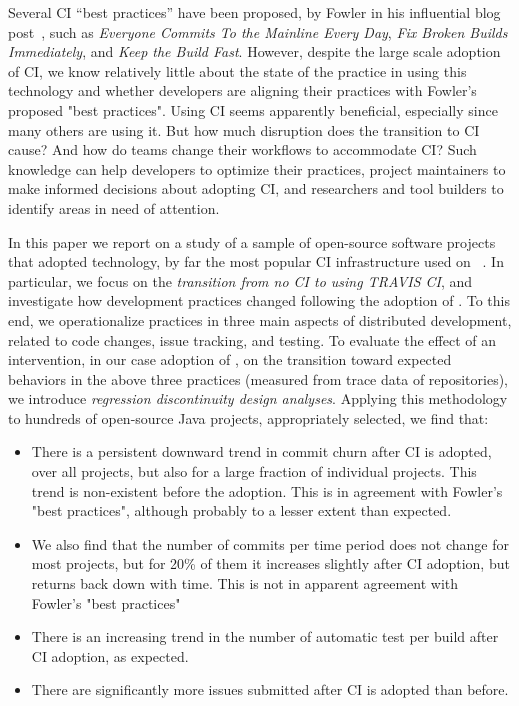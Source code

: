 Several CI ``best practices'' have been proposed, \eg by Fowler in his 
influential blog post~\cite{fowler2000continuous}, such as 
\emph{Everyone Commits To the Mainline Every Day}, 
\emph{Fix Broken Builds Immediately},
and \emph{Keep the Build Fast}.
However, despite the large scale adoption of CI, we know relatively little 
about the state of the practice in using this technology and whether 
developers are aligning their practices with Fowler's proposed "best practices".
Using CI seems apparently beneficial, especially since many others are using it.
But how much disruption does the transition to CI cause?
And how do teams change their workflows to accommodate CI?
Such knowledge can help developers to optimize their practices, project 
maintainers to make informed decisions about adopting CI, and 
researchers and tool builders to identify areas in need of attention.

In this paper we report on a study of a sample of \GH open-source 
software projects that adopted \Tvis technology, by far the most popular 
CI infrastructure used on \GH~\cite{Hilton2016}.
In particular, we focus on the \emph{transition from no CI to using 
T{\footnotesize RAVIS} CI}, and investigate how development practices 
changed following the adoption of \Tvis.
To this end, we operationalize practices in three main aspects of 
distributed development, related to code changes, issue tracking, 
and testing.
To evaluate the effect of an intervention, in our case adoption of
\Tvis, on the transition toward expected behaviors in the above 
three practices (measured from trace data of \GH repositories),
we introduce \emph{regression discontinuity design analyses}.
Applying this methodology to hundreds of open-source Java 
projects, appropriately selected, we find that:


\begin{itemize}

\item There is a persistent downward trend in commit churn after CI is adopted, over all projects, but also for a large fraction of individual projects. This trend is non-existent before the adoption. This is in agreement with Fowler's "best practices", although probably to a lesser extent than expected.

\item We also find that the number of commits per time period does not change for most projects, but for 20\% of them it increases slightly after CI adoption, but returns back down with time.
This is not in apparent agreement with Fowler's "best practices"

\item There is an increasing trend in the number of automatic test per build after CI adoption, as expected.

\item There are significantly more issues submitted after CI is adopted than before.

\end{itemize}


